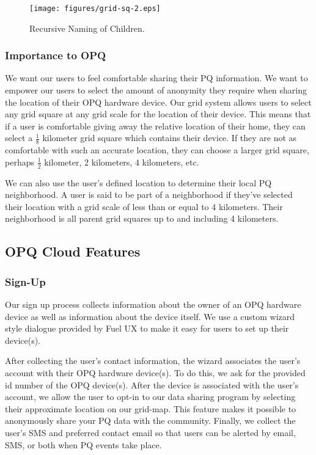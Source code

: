 \documentclass[11pt]{article}
\begin{document}
\begin{figure}[htbp]
	\centering
	\texttt{[image: figures/grid-sq-2.eps]}
	\caption{Recursive Naming of Children.}
	\label{fig:second_children}
\end{figure}

\subsubsection{Importance to OPQ}
We want our users to feel comfortable sharing their PQ information. We want to empower our users to select the amount of anonymity they require when sharing the location of their OPQ hardware device. Our grid system allows users to select any grid square at any grid scale for the location of their device. This means that if a user is comfortable giving away the relative location of their home, they can select a $\frac{1}{8}$ kilometer grid square which contains their device. If they are not as comfortable with such an accurate location, they can choose a larger grid square, perhaps $\frac{1}{2}$ kilometer, 2 kilometers, 4 kilometers, etc.

We can also use the user's defined location to determine their local PQ neighborhood. A user is said to be part of a neighborhood if they've selected their location with a grid scale of less than or equal to 4 kilometers. Their neighborhood is all parent grid squares up to and including 4 kilometers.

\subsection{OPQ Cloud Features}
\subsubsection{Sign-Up}
Our sign up process collects information about the owner of an OPQ hardware device as well as information about the device itself. We use a custom wizard style dialogue provided by Fuel UX to make it easy for users to set up their device(s). 

After collecting the user's contact information, the wizard associates the user's account with their OPQ hardware device(s). To do this, we ask for the provided id number of the OPQ device(s). After the device is associated with the user's account, we allow the user to opt-in to our data sharing program by selecting their approximate location on our grid-map. This feature makes it possible to anonymously share your PQ data with the community. Finally, we collect the user's SMS and preferred contact email so that users can be alerted by email, SMS, or both when PQ events take place.
\end{document}
